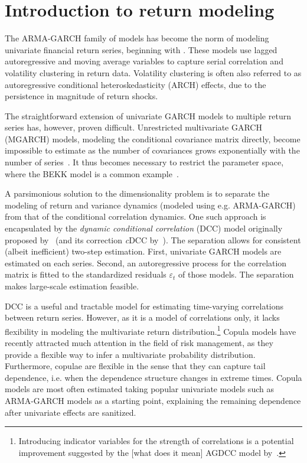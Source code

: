 
\section{Introduction to return modeling}
\label{sec:intro_copula}

The ARMA-GARCH family of models has become the norm of modeling univariate financial return series, beginning with \textcite{Bollerslev1986}. These models use lagged autoregressive and moving average variables to capture serial correlation and volatility clustering in return data. Volatility clustering is often also referred to as autoregressive conditional heteroskedasticity (ARCH) effects, due to the persistence in magnitude of return shocks.

The straightforward extension of univariate GARCH models to multiple return series has, however, proven difficult. Unrestricted multivariate GARCH (MGARCH) models, modeling the conditional covariance matrix directly, become impossible to estimate as the number of covariances grows exponentially with the number of series~\autocite{WhyMGARCHSucks}. It thus becomes necessary to restrict the parameter space, where the BEKK model is a common example~\autocite{BEKKModel}.

A parsimonious solution to the dimensionality problem is to separate the modeling of return and variance dynamics (modeled using e.g. ARMA-GARCH) from that of the conditional correlation dynamics. One such approach is encapsulated by the \emph{dynamic conditional correlation} (DCC) model originally proposed by~\autocite{Engle2002} (and its correction \emph{c}DCC by~\autocite{Aielli2013}). The separation allows for consistent (albeit inefficient) two-step estimation. First, univariate GARCH models are estimated on each series. Second, an autoregressive process for the correlation matrix is fitted to the standardized residuals $\varepsilon_t$ of those models. The separation makes large-scale estimation feasible.

DCC is a useful and tractable model for estimating time-varying correlations between return series. However, as it is a model of correlations only, it lacks flexibility in modeling the multivariate return distribution.\footnote{Introducing indicator variables for the strength of correlations is a potential improvement suggested by the [what does it mean] AGDCC model by~\autocite{Cappiello2006}.} Copula models have recently attracted much attention in the field of risk management, as they provide a flexible way to infer a multivariate probability distribution. Furthermore, copulae are flexible in the sense that they can capture tail dependence, i.e. when the dependence structure changes in extreme times. Copula models are most often estimated taking popular univariate models such as ARMA-GARCH models as a starting point, explaining the remaining dependence after univariate effects are sanitized. 

